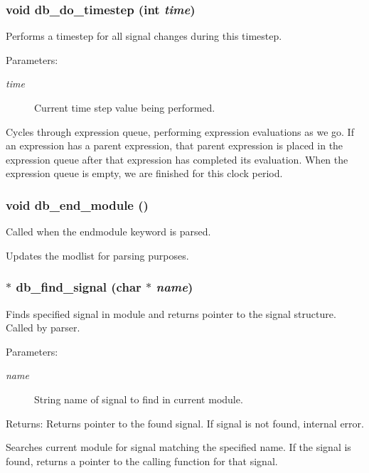 \subsubsection{\setlength{\rightskip}{0pt plus 5cm}void db\_\-do\_\-timestep (int {\em time})}\label{db_8c_a45}


Performs a timestep for all signal changes during this timestep. 

\begin{Desc}
\item[Parameters:]
\begin{description}
\item[{\em time}]Current time step value being performed.\end{description}
\end{Desc}
Cycles through expression queue, performing expression evaluations as we go. If an expression has a parent expression, that parent expression is placed in the expression queue after that expression has completed its evaluation. When the expression queue is empty, we are finished for this clock period. 
\subsubsection{\setlength{\rightskip}{0pt plus 5cm}void db\_\-end\_\-module ()}\label{db_8c_a24}


Called when the endmodule keyword is parsed. 

Updates the modlist for parsing purposes. 
\subsubsection{$\ast$ db\_\-find\_\-signal (char $\ast$ {\em name})}\label{db_8c_a30}


Finds specified signal in module and returns pointer to the signal structure. Called by parser. 

\begin{Desc}
\item[Parameters:]
\begin{description}
\item[{\em name}]String name of signal to find in current module.\end{description}
\end{Desc}
\begin{Desc}
\item[Returns:]Returns pointer to the found signal. If signal is not found, internal error.\end{Desc}
Searches current module for signal matching the specified name. If the signal is found, returns a pointer to the calling function for that signal. 
